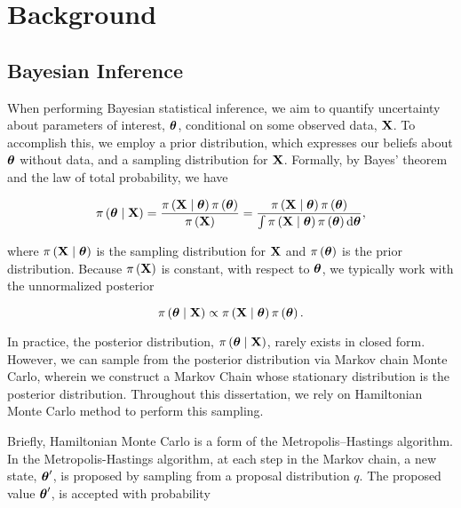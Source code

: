 \chapter{Background}
\label{ch:background}
\section{Bayesian Inference}
\label{ch_2:sec:bayesian-mcmc}

When performing Bayesian statistical inference, we aim to quantify uncertainty about parameters of interest, \( \boldsymbol{\theta} \), conditional on some observed data, \( \mathbf{X} \).
To accomplish this, we employ a prior distribution, which expresses our beliefs about \( \boldsymbol{\theta} \) without data, and a sampling distribution for \( \mathbf{X} \).
Formally, by Bayes' theorem and the law of total probability, we have 

\begin{equation}
    \pi \left( \boldsymbol{\theta} \mid \mathbf{X} \right) = \frac{\pi \left( \mathbf{X} \mid \boldsymbol{\theta} \right) \pi \left( \boldsymbol{\theta} \right)}{\pi \left(  \mathbf{X} \right)} = \frac{\pi \left( \mathbf{X} \mid \boldsymbol{\theta} \right) \pi \left( \boldsymbol{\theta} \right)}{\int \pi \left( \mathbf{X} \mid \boldsymbol{\theta} \right) \pi \left( \boldsymbol{\theta} \right) \mathrm{d} \boldsymbol{\theta}},
\end{equation}

where \( \pi \left( \mathbf{X} \mid \boldsymbol{\theta} \right) \) is the sampling distribution for \( \mathbf{X} \) and \( \pi \left( \boldsymbol{\theta} \right) \) is the prior distribution.
Because \( \pi \left( \mathbf{X} \right) \) is constant, with respect to \( \boldsymbol{\theta} \), we typically work with the unnormalized posterior

\begin{equation}
    \pi \left( \boldsymbol{\theta} \mid \mathbf{X} \right) \propto \pi \left( \mathbf{X} \mid \boldsymbol{\theta} \right) \pi \left( \boldsymbol{\theta} \right).
\end{equation}

In practice, the posterior distribution, \( \pi \left( \boldsymbol{\theta} \mid \mathbf{X} \right) \), rarely exists in closed form.
However, we can sample from the posterior distribution via Markov chain Monte Carlo, wherein we construct a Markov Chain whose stationary distribution is the posterior distribution.
Throughout this dissertation, we rely on Hamiltonian Monte Carlo method to perform this sampling.

Briefly, Hamiltonian Monte Carlo is a form of the Metropolis–Hastings algorithm.
In the Metropolis-Hastings algorithm, at each step in the Markov chain, a new state, \( \boldsymbol{\theta}^\prime \), is proposed by sampling from a proposal distribution \( q \).
The proposed value \( \boldsymbol{\theta}^\prime \), is accepted with probability 

